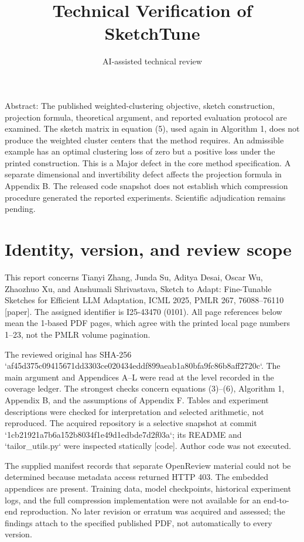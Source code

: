 \documentclass[10pt]{article}
\title{Technical Verification of SketchTune}
\author{AI-assisted technical review}
\date{}
\begin{document}
\maketitle
Abstract: The published weighted-clustering objective, sketch construction, projection formula, theoretical argument, and reported evaluation protocol are examined. The sketch matrix in equation (5), used again in Algorithm 1, does not produce the weighted cluster centers that the method requires. An admissible example has an optimal clustering loss of zero but a positive loss under the printed construction. This is a Major defect in the core method specification. A separate dimensional and invertibility defect affects the projection formula in Appendix B. The released code snapshot does not establish which compression procedure generated the reported experiments. Scientific adjudication remains pending.\par
\section*{Identity, version, and review scope}
This report concerns Tianyi Zhang, Junda Su, Aditya Desai, Oscar Wu, Zhaozhuo Xu, and Anshumali Shrivastava, Sketch to Adapt: Fine-Tunable Sketches for Efficient LLM Adaptation, ICML 2025, PMLR 267, 76088–76110 [paper]. The assigned identifier is I25-43470 (0101). All page references below mean the 1-based PDF pages, which agree with the printed local page numbers 1–23, not the PMLR volume pagination.\par
The reviewed original has SHA-256 `af45d375c09415671dd3303ce020434eddf899aeab1a80bfa9fc86b8aff2720c`. The main argument and Appendices A–L were read at the level recorded in the coverage ledger. The strongest checks concern equations (3)–(6), Algorithm 1, Appendix B, and the assumptions of Appendix F. Tables and experiment descriptions were checked for interpretation and selected arithmetic, not reproduced. The acquired repository is a selective snapshot at commit `1cb21921a7b6a152b8034f1e49d1edbde7d2f03a`; its README and `tailor\_utils.py` were inspected statically [code]. Author code was not executed.\par
The supplied manifest records that separate OpenReview material could not be determined because metadata access returned HTTP 403. The embedded appendices are present. Training data, model checkpoints, historical experiment logs, and the full compression implementation were not available for an end-to-end reproduction. No later revision or erratum was acquired and assessed; the findings attach to the specified published PDF, not automatically to every version.\par
\end{document}
